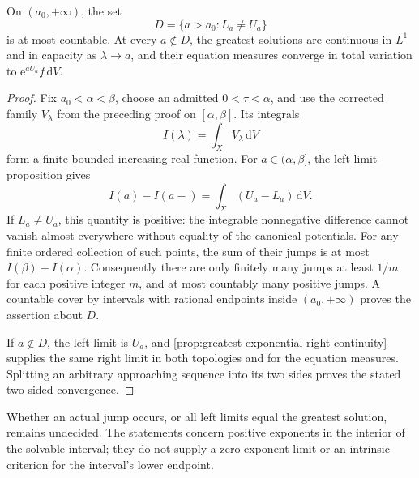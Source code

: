 \begin{proposition}\label{prop:greatest-exponential-countable-jumps}
On $(a_0,+\infty)$, the set
\[
 D=\{a>a_0:L_a\ne U_a\}
\]
is at most countable. At every $a\notin D$, the greatest solutions are continuous in $L^1$ and in capacity as $\lambda\to a$, and their equation measures converge in total variation to $\mathrm e^{aU_a}f\,\mathrm dV$.
\end{proposition}
\begin{proof}
Fix $a_0<\alpha<\beta$, choose an admitted $0<\tau<\alpha$, and use the corrected family $V_\lambda$ from the preceding proof on $[\alpha,\beta]$. Its integrals
\[
 I(\lambda)=\int_XV_\lambda\,\mathrm dV
\]
form a finite bounded increasing real function. For $a\in(\alpha,\beta]$, the left-limit proposition gives
\[
 I(a)-I(a-)=\int_X(U_a-L_a)\,\mathrm dV.
\]
If $L_a\ne U_a$, this quantity is positive: the integrable nonnegative difference cannot vanish almost everywhere without equality of the canonical potentials. For any finite ordered collection of such points, the sum of their jumps is at most $I(\beta)-I(\alpha)$. Consequently there are only finitely many jumps at least $1/m$ for each positive integer $m$, and at most countably many positive jumps. A countable cover by intervals with rational endpoints inside $(a_0,+\infty)$ proves the assertion about $D$.

If $a\notin D$, the left limit is $U_a$, and \cref{prop:greatest-exponential-right-continuity} supplies the same right limit in both topologies and for the equation measures. Splitting an arbitrary approaching sequence into its two sides proves the stated two-sided convergence.
\end{proof}

Whether an actual jump occurs, or all left limits equal the greatest solution, remains undecided. The statements concern positive exponents in the interior of the solvable interval; they do not supply a zero-exponent limit or an intrinsic criterion for the interval's lower endpoint.
